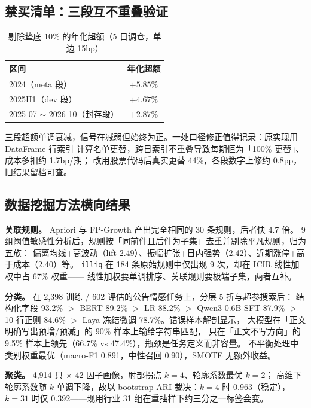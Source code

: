 \documentclass[sigconf]{acmart}
\begin{document}
\subsection{禁买清单：三段互不重叠验证}

\begin{table}[t]
\caption{剔除垫底 10\% 的年化超额（5 日调仓，单边 15bp）}
\label{tab:screen}
\small
\begin{tabular}{lc}
\toprule
区间 & 年化超额 \\
\midrule
2024（meta 段） & $+5.85\%$ \\
2025H1（dev 段） & $+4.67\%$ \\
2025-07 $\sim$ 2026-10（封存段） & $+2.87\%$ \\
\bottomrule
\end{tabular}
\end{table}

三段超额单调衰减，信号在减弱但始终为正。一处口径修正值得记录：原实现用 DataFrame 行索引
计算名单更替，跨日索引不重叠导致每期恒为「100\% 更替」、成本多扣约 1.7bp/期；
改用股票代码后真实更替 44\%，各段数字上修约 0.8pp，旧结果留档可查。

\subsection{数据挖掘方法横向结果}

\textbf{关联规则。} Apriori 与 FP-Growth 产出完全相同的 30 条规则，后者快 4.7 倍。
9 组阈值敏感性分析后，规则按「同前件且后件为子集」去重并剔除平凡规则，归为五族：
偏离均线+高波动（lift 2.49）、振幅扩张+日内强势（2.42）、近期涨停+高于成本（2.40）等。
\texttt{illiq} 在 184 条原始规则中仅出现 9 次，却在 ICIR 线性加权中占 67\% 权重——
线性加权要单调排序、关联规则要极端子集，两者互补。

\textbf{分类。} 在 2{,}398 训练 / 602 评估的公告情感任务上，分层 5 折与超参搜索后：
结构化字段 93.2\% $>$ BERT 89.2\% $>$ LR 88.2\% $>$ Qwen3-0.6B SFT 87.9\%
$>$ 10 行正则 84.6\% $>$ Laya 冻结微调 78.7\%。错误样本解剖显示，
大模型在「正文明确写出预增/预减」的 90\% 样本上输给字符串匹配，
只在「正文不写方向」的 9.5\% 样本上领先（66.7\% vs 47.4\%），瓶颈是任务定义而非容量。
不平衡处理中类别权重最优（macro-F1 0.891，中性召回 0.90），SMOTE 无额外收益。

\textbf{聚类。} 4{,}914 只 $\times$ 42 因子画像，肘部拐点 $k=4$、轮廓系数最优 $k=2$；
高维下轮廓系数随 $k$ 单调下降，故以 bootstrap ARI 裁决：$k=4$ 时 0.963（稳定），
$k=31$ 时仅 0.392——现用行业 31 组在重抽样下约三分之一标签会变。
\end{document}

